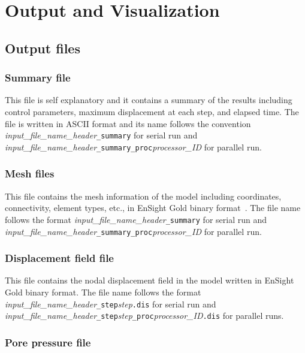 \chapter{Output and Visualization}

\section{Output files}

\subsection{Summary file}

This file is self explanatory and it contains a summary of the results including control parameters, maximum displacement at each step, and elapsed time. The file is written in ASCII format and its name follows the convention \emph{input\_file\_name\_header}\texttt{\_summary} for serial run and \emph{input\_file\_name\_header}\texttt{\_summary\_proc}\emph{processor\_ID} for parallel run.

\subsection{Mesh files}

This file contains the mesh information of the model including coordinates, connectivity, element types, etc., in EnSight Gold binary format~\citep[see][]{ensight2008}. The file name follows the format \emph{input\_file\_name\_header}\texttt{\_summary} for serial run and \emph{input\_file\_name\_header}\texttt{\_summary\_proc}\emph{processor\_ID} for parallel run.

\subsection{Displacement field file}

This file contains the nodal displacement field in the model written in EnSight Gold binary format. The file name follows the format \emph{input\_file\_name\_header}\texttt{\_step}\emph{step}\texttt{.dis} for serial run and \emph{input\_file\_name\_header}\texttt{\_step}\emph{step}\texttt{\_proc}\emph{processor\_ID}\texttt{.dis} for parallel runs.

\subsection{Pore pressure file}

